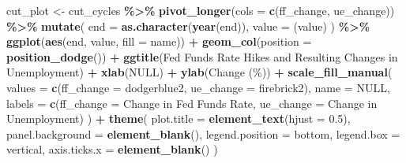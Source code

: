 \documentclass[
]{article}
\newenvironment{Shaded}{\begin{snugshade}}{\end{snugshade}}
\newcommand{\AttributeTok}[1]{\textcolor[rgb]{0.13,0.29,0.53}{#1}}
\newcommand{\ConstantTok}[1]{\textcolor[rgb]{0.56,0.35,0.01}{#1}}
\newcommand{\FloatTok}[1]{\textcolor[rgb]{0.00,0.00,0.81}{#1}}
\newcommand{\FunctionTok}[1]{\textcolor[rgb]{0.13,0.29,0.53}{\textbf{#1}}}
\newcommand{\NormalTok}[1]{#1}
\newcommand{\OtherTok}[1]{\textcolor[rgb]{0.56,0.35,0.01}{#1}}
\newcommand{\SpecialCharTok}[1]{\textcolor[rgb]{0.81,0.36,0.00}{\textbf{#1}}}
\newcommand{\StringTok}[1]{\textcolor[rgb]{0.31,0.60,0.02}{#1}}
\begin{document}
\begin{Shaded}
\begin{Highlighting}[]
\NormalTok{cut\_plot }\OtherTok{\textless{}{-}}\NormalTok{ cut\_cycles }\SpecialCharTok{\%\textgreater{}\%}
  \FunctionTok{pivot\_longer}\NormalTok{(}\AttributeTok{cols =} \FunctionTok{c}\NormalTok{(ff\_change, ue\_change)) }\SpecialCharTok{\%\textgreater{}\%} 
  \FunctionTok{mutate}\NormalTok{(}
    \AttributeTok{end =} \FunctionTok{as.character}\NormalTok{(}\FunctionTok{year}\NormalTok{(end)),}
    \AttributeTok{value =}\NormalTok{ (value)}
\NormalTok{  ) }\SpecialCharTok{\%\textgreater{}\%}
  \FunctionTok{ggplot}\NormalTok{(}\FunctionTok{aes}\NormalTok{(end, value, }\AttributeTok{fill =}\NormalTok{ name)) }\SpecialCharTok{+}
  \FunctionTok{geom\_col}\NormalTok{(}\AttributeTok{position =} \FunctionTok{position\_dodge}\NormalTok{()) }\SpecialCharTok{+}
  \FunctionTok{ggtitle}\NormalTok{(}\StringTok{\textquotesingle{}Fed Funds Rate Hikes and Resulting Changes in Unemployment\textquotesingle{}}\NormalTok{) }\SpecialCharTok{+}
  \FunctionTok{xlab}\NormalTok{(}\ConstantTok{NULL}\NormalTok{) }\SpecialCharTok{+}
  \FunctionTok{ylab}\NormalTok{(}\StringTok{\textquotesingle{}Change (\%)\textquotesingle{}}\NormalTok{) }\SpecialCharTok{+} 
  \FunctionTok{scale\_fill\_manual}\NormalTok{(}
    \AttributeTok{values =} \FunctionTok{c}\NormalTok{(}\StringTok{\textquotesingle{}ff\_change\textquotesingle{}} \OtherTok{=} \StringTok{\textquotesingle{}dodgerblue2\textquotesingle{}}\NormalTok{, }\StringTok{\textquotesingle{}ue\_change\textquotesingle{}} \OtherTok{=} \StringTok{\textquotesingle{}firebrick2\textquotesingle{}}\NormalTok{), }
    \AttributeTok{name =} \ConstantTok{NULL}\NormalTok{, }
    \AttributeTok{labels =} \FunctionTok{c}\NormalTok{(}\StringTok{\textquotesingle{}ff\_change\textquotesingle{}} \OtherTok{=} \StringTok{\textquotesingle{}Change in Fed Funds Rate\textquotesingle{}}\NormalTok{, }\StringTok{\textquotesingle{}ue\_change\textquotesingle{}} \OtherTok{=} \StringTok{\textquotesingle{}Change in Unemployment\textquotesingle{}}\NormalTok{)}
\NormalTok{  ) }\SpecialCharTok{+}
  \FunctionTok{theme}\NormalTok{(}
    \AttributeTok{plot.title =} \FunctionTok{element\_text}\NormalTok{(}\AttributeTok{hjust =} \FloatTok{0.5}\NormalTok{),}
    \AttributeTok{panel.background =} \FunctionTok{element\_blank}\NormalTok{(),}
    \AttributeTok{legend.position =} \StringTok{\textquotesingle{}bottom\textquotesingle{}}\NormalTok{, }\AttributeTok{legend.box =} \StringTok{\textquotesingle{}vertical\textquotesingle{}}\NormalTok{,}
    \AttributeTok{axis.ticks.x =} \FunctionTok{element\_blank}\NormalTok{()}
\NormalTok{  )}


\end{Highlighting}
\end{Shaded}
\end{document}
